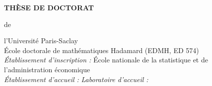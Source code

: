\documentclass[a4paper,12pt]{book}
\begin{document}
{\begin{center}
{\Large\bf TH\`ESE DE DOCTORAT}
\end{center}
\begin{center}
{de }
\end{center}
\begin{center}
 {\Large\sc l'Universit\'e Paris-Saclay}\\
  \vspace*{0.4cm}
\'Ecole doctorale de math\'ematiques Hadamard (EDMH, ED 574)\\  
 \vspace*{0.4cm} 
{\small \it \'Etablissement d'inscription : } 
    \'Ecole nationale de la statistique et de l'administration \'economique\\
 \vspace*{0.2cm} 
{\small \it \'Etablissement d'accueil : }    
\vspace*{0.2cm} 
{\small \it Laboratoire d'accueil : }     

\end{center}}
\end{document}
